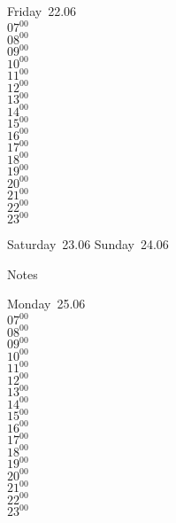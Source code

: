 \documentclass[11pt, a4paper]{book}\usepackage[]{graphicx}\usepackage[]{color}
\begin{document}
\begin{weekdaybox}
  Friday~22.06\\
  { 
  \vfill
  $07^{00}$\\
$08^{00}$\\
$09^{00}$\\
$10^{00}$\\
$11^{00}$\\
$12^{00}$\\
$13^{00}$\\
$14^{00}$\\
$15^{00}$\\
$16^{00}$\\
$17^{00}$\\
$18^{00}$\\
$19^{00}$\\
$20^{00}$\\
$21^{00}$\\
$22^{00}$\\
$23^{00}$\\
  }
\end{weekdaybox}
\begin{weekendbox}
  Saturday~23.06
  \tcblower
  Sunday~24.06
\end{weekendbox} %
\begin{notebox}
  Notes
\end{notebox}
\clearpage
\begin{headerbox}
\end{headerbox}
\begin{weekdaybox}
  Monday~25.06\\
  { 
  \vfill
  $07^{00}$\\
$08^{00}$\\
$09^{00}$\\
$10^{00}$\\
$11^{00}$\\
$12^{00}$\\
$13^{00}$\\
$14^{00}$\\
$15^{00}$\\
$16^{00}$\\
$17^{00}$\\
$18^{00}$\\
$19^{00}$\\
$20^{00}$\\
$21^{00}$\\
$22^{00}$\\
$23^{00}$\\
  }
\end{weekdaybox}
\end{document}

